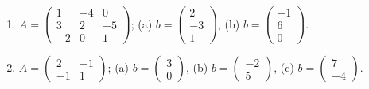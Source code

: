 \begin{enumerate}[label=\arabic*., leftmargin=*]
\item $A=\begin{pmatrix}1&-4&0\\3&2&-5\\-2&0&1\end{pmatrix}$; \quad
(a) $b=\begin{pmatrix}2\\-3\\1\end{pmatrix}$, \quad
(b) $b=\begin{pmatrix}-1\\6\\0\end{pmatrix}$.

\item $A=\begin{pmatrix}2&-1\\-1&1\end{pmatrix}$; \quad
(a) $b=\begin{pmatrix}3\\0\end{pmatrix}$, \quad
(b) $b=\begin{pmatrix}-2\\5\end{pmatrix}$, \quad
(c) $b=\begin{pmatrix}7\\-4\end{pmatrix}$.

\end{enumerate}
 